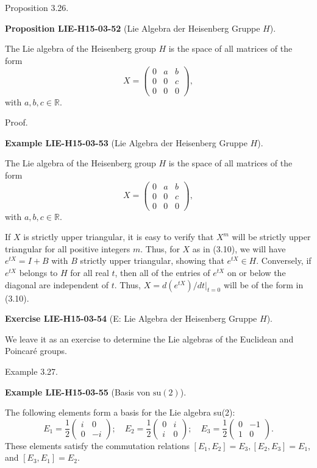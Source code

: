 \documentclass[10pt, letterpaper]{article}
\newcommand{\CustomHeading}[3]{%
  \par\medskip\noindent%
  \textbf{#1 #2} \textnormal{(#3)}.\enskip%
}
\newenvironment{PROP}[2]{\begin{unitbox}\CustomHeading{Proposition}{#1}{#2}}{\end{unitbox}}
\newenvironment{EXA}[2]{\begin{unitbox}\CustomHeading{Example}{#1}{#2}}{\end{unitbox}}
\newenvironment{EXE}[2]{\begin{unitbox}\CustomHeading{Exercise}{#1}{#2}}{\end{unitbox}}
\begin{document}
Proposition 3.26. 

\begin{PROP}{LIE-H15-03-52}{Lie Algebra der Heisenberg Gruppe $H$}
The Lie algebra of the Heisenberg group $H$ is the space of all matrices of the form
$$
X=\left(\begin{array}{lll}
0 & a & b \\
0 & 0 & c \\
0 & 0 & 0
\end{array}\right),
$$
with $a, b, c \in \mathbb{R}$.
\end{PROP}

Proof. 


\begin{EXA}{LIE-H15-03-53}{Lie Algebra der Heisenberg Gruppe $H$}
The Lie algebra of the Heisenberg group $H$ is the space of all matrices of the form
$$
X=\left(\begin{array}{lll}
0 & a & b \\
0 & 0 & c \\
0 & 0 & 0
\end{array}\right),
$$
with $a, b, c \in \mathbb{R}$.

If $X$ is strictly upper triangular, it is easy to verify that $X^{m}$ will be strictly upper triangular for all positive integers $m$. Thus, for $X$ as in (3.10), we will have $e^{t X}=I+B$ with $B$ strictly upper triangular, showing that $e^{t X} \in H$. Conversely, if $e^{t X}$ belongs to $H$ for all real $t$, then all of the entries of $e^{t X}$ on or below the diagonal are independent of $t$. Thus, $X=d\left(e^{t X}\right) /\left.d t\right|_{t=0}$ will be of the form in (3.10).
\end{EXA}


\begin{EXE}{LIE-H15-03-54}{E: Lie Algebra der Heisenberg Gruppe $H$}
We leave it as an exercise to determine the Lie algebras of the Euclidean and Poincaré groups.
\end{EXE}

Example 3.27. 

\begin{EXA}{LIE-H15-03-55}{Basis von $\mathrm{su}(2)$}
The following elements form a basis for the Lie algebra su(2):
$$
E_{1}=\frac{1}{2}\left(\begin{array}{rr}
i & 0 \\
0 & -i
\end{array}\right) ; \quad E_{2}=\frac{1}{2}\left(\begin{array}{ll}
0 & i \\
i & 0
\end{array}\right) ; \quad E_{3}=\frac{1}{2}\left(\begin{array}{rr}
0 & -1 \\
1 & 0
\end{array}\right) .
$$
These elements satisfy the commutation relations $\left[E_{1}, E_{2}\right]=E_{3},\left[E_{2}, E_{3}\right]=E_{1}$, and $\left[E_{3}, E_{1}\right]=E_{2}$.
\end{EXA}
\end{document}
